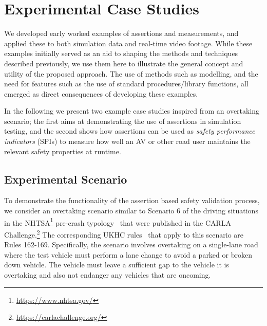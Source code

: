 \section{Experimental Case Studies} \label{Experimental_scenario}

We developed early worked examples of assertions and measurements, and applied these to both simulation data and real-time video footage.
%
%
%
While these examples initially served as an aid to shaping the methods and techniques described previously, we use them here to illustrate the general concept and utility of the proposed approach.
%
The use of methods such as modelling, and the need for features such as the use of standard procedures/library functions, all emerged as direct consequences of developing these examples.

In the following we present two example case studies inspired from an overtaking scenario; the first aims at demonstrating the use of assertions in simulation testing, and the second shows how assertions can be used as \emph{safety performance indicators} (SPIs) to measure how well an AV or other road user maintains the relevant safety properties at runtime.

\subsection{Experimental Scenario} %
\label{carla_challenge}

To demonstrate the functionality of the assertion based safety validation process, we consider an overtaking scenario similar to Scenario 6 of the driving situations in the NHTSA\footnote{\url{https://www.nhtsa.gov/}} pre-crash typology~\cite{nhtsa_precrash} that were published in the CARLA Challenge.\footnote{\url{https://carlachallenge.org/}} The corresponding UKHC rules~\cite{highwayCode} that apply to this scenario are Rules 162-169. Specifically, the scenario involves overtaking on a single-lane road where the test vehicle must perform a lane change to avoid a parked or broken down vehicle. 
The vehicle must leave a sufficient gap to the vehicle it is overtaking and also not endanger any vehicles that are oncoming.

